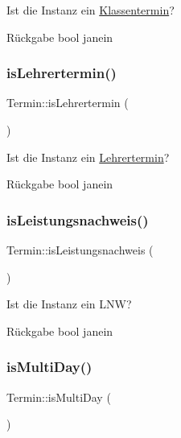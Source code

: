 Ist die Instanz ein \mbox{\hyperlink{class_klassentermin}{Klassentermin}}? \begin{DoxyReturn}{Rückgabe}
bool janein 
\end{DoxyReturn}
\mbox{\label{interface_termin_ab40fb4c2e09479bfe5749243f59246c1}} 
\subsubsection{\texorpdfstring{is\+Lehrertermin()}{isLehrertermin()}}
{\footnotesize\ttfamily Termin\+::is\+Lehrertermin (\begin{DoxyParamCaption}{ }\end{DoxyParamCaption})}

Ist die Instanz ein \mbox{\hyperlink{class_lehrertermin}{Lehrertermin}}? \begin{DoxyReturn}{Rückgabe}
bool janein 
\end{DoxyReturn}
\mbox{\label{interface_termin_a5e994b8b00058d167d82514053de3c88}} 
\subsubsection{\texorpdfstring{is\+Leistungsnachweis()}{isLeistungsnachweis()}}
{\footnotesize\ttfamily Termin\+::is\+Leistungsnachweis (\begin{DoxyParamCaption}{ }\end{DoxyParamCaption})}

Ist die Instanz ein L\+NW? \begin{DoxyReturn}{Rückgabe}
bool janein 
\end{DoxyReturn}
\mbox{\label{interface_termin_a3ee9c6ae1bcd6424f57abaac24b7341b}} 
\subsubsection{\texorpdfstring{is\+Multi\+Day()}{isMultiDay()}}
{\footnotesize\ttfamily Termin\+::is\+Multi\+Day (\begin{DoxyParamCaption}{ }\end{DoxyParamCaption})}

